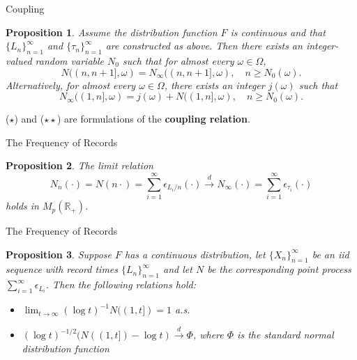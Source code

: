 \documentclass{beamer}
\newtheorem{proposition}{Proposition}
\begin{document}
\begin{frame}{Coupling}
    \begin{proposition}
        Assume the distribution function $F$ is continuous and that $\{L_n\}_{n = 1}^{\infty}$ and $\{\tau_n\}_{n = 1}^{\infty}$ are constructed as above. Then there exists an integer-valued random variable $N_0$ such that for almost every $\omega \in \Omega$,
        \[
        N((n, n + 1], \omega) = N_{\infty}((n, n + 1], \omega), \quad n \ge N_0(\omega). \tag{$\star$}
        \]
        Alternatively, for almost every $\omega \in \Omega$, there exists an integer $j(\omega)$ such that
        \[
        N_{\infty}((1, n], \omega) = j(\omega) + N((1, n], \omega), \quad n \ge N_0(\omega). \tag{$\star\star$}
        \]
    \end{proposition}
    ($\star$) and ($\star\star$) are formulations of the \textbf{coupling relation}.
\end{frame}

\begin{frame}{The Frequency of Records}
    \begin{proposition}
        The limit relation
        \[
        N_n(\cdot) = N(n\cdot) = \sum_{i = 1}^{\infty} \epsilon_{L_i / n}(\cdot) \xrightarrow{d} N_{\infty}(\cdot) = \sum_{i = 1}^{\infty} \epsilon_{\tau_i}(\cdot)
        \]
        holds in $M_p(\mathbb{R}_+)$.
    \end{proposition}
\end{frame}

\begin{frame}{The Frequency of Records}
    \begin{proposition}
        Suppose $F$ has a continuous distribution, let $\{X_n\}_{n = 1}^{\infty}$ be an iid sequence with record times $\{L_n\}_{n = 1}^{\infty}$ and let $N$ be the corresponding point process $\sum_{i = 1}^{\infty} \epsilon_{L_i}$. Then the following relations hold:
        \begin{itemize}
            \item $\lim_{t \to \infty} (\log t)^{-1}N((1, t]) = 1$ a.s.
            \item $(\log t)^{-1 / 2}(N((1, t]) - \log t) \xrightarrow{d} \Phi$, where $\Phi$ is the standard normal distribution function
        \end{itemize}
    \end{proposition}
\end{frame}
\end{document}
